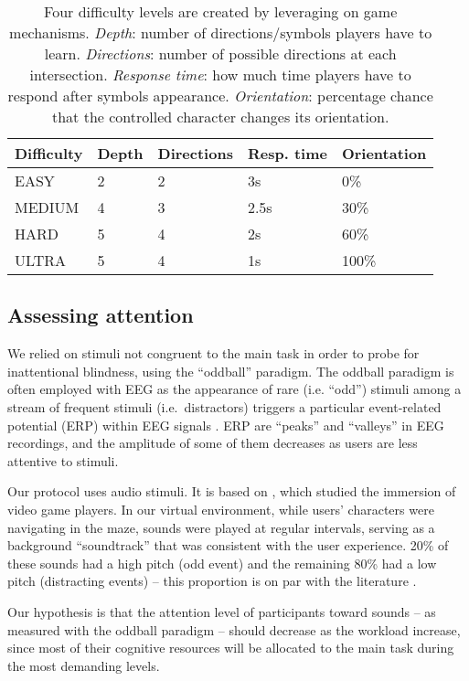 \documentclass[]{sigchi}
\begin{document}
\begin{table}
\centering
\begin{tabular}{lllll}
\toprule\addlinespace
Difficulty & Depth & Directions & Resp. time &
Orientation\tabularnewline
\midrule
EASY & 2 & 2 & 3s & 0\%\tabularnewline
MEDIUM & 4 & 3 & 2.5s & 30\%\tabularnewline
HARD & 5 & 4 & 2s & 60\%\tabularnewline
ULTRA & 5 & 4 & 1s & 100\%\tabularnewline
\bottomrule
\end{tabular}
\caption{Four difficulty levels are created by leveraging on game
mechanisms. \emph{Depth}: number of directions/symbols players have to
learn. \emph{Directions}: number of possible directions at each
intersection. \emph{Response time}: how much time players have to
respond after symbols appearance. \emph{Orientation}: percentage chance
that the controlled character changes its
orientation.}\label{tab:difficulties}
\end{table}

\subsection{Assessing attention}\label{assessing-attention}

We relied on stimuli not congruent to the main task in order to probe
for inattentional blindness, using the ``oddball'' paradigm. The oddball
paradigm is often employed with EEG as the appearance of rare (i.e.
``odd'') stimuli among a stream of frequent stimuli (i.e.~distractors)
triggers a particular event-related potential (ERP) within EEG signals
\citep{Coull1998}. ERP are ``peaks'' and ``valleys'' in EEG recordings,
and the amplitude of some of them decreases as users are less attentive
to stimuli.

Our protocol uses audio stimuli. It is based on \citep{Burns2015}, which
studied the immersion of video game players. In our virtual environment,
while users' characters were navigating in the maze, sounds were played
at regular intervals, serving as a background ``soundtrack'' that was
consistent with the user experience. 20\% of these sounds had a high
pitch (odd event) and the remaining 80\% had a low pitch (distracting
events) -- this proportion is on par with the literature
\citep{Burns2015, Ferrez2008}.

Our hypothesis is that the attention level of participants toward sounds
-- as measured with the oddball paradigm -- should decrease as the
workload increase, since most of their cognitive resources will be
allocated to the main task during the most demanding levels.
\end{document}
